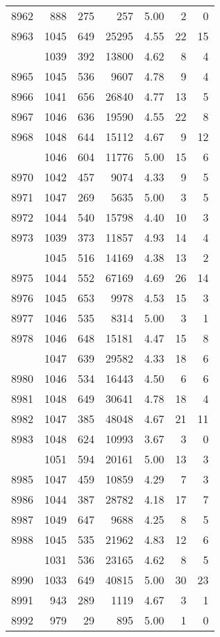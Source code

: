 \documentclass[
]{article}
\begin{document}
\begin{table}
\begin{tabular}[t]{lrrrrrr}
8962 & 888 & 275 & 257 & 5.00 & 2 & 0\\
8963 & 1045 & 649 & 25295 & 4.55 & 22 & 15\\
\addlinespace
8964 & 1039 & 392 & 13800 & 4.62 & 8 & 4\\
8965 & 1045 & 536 & 9607 & 4.78 & 9 & 4\\
8966 & 1041 & 656 & 26840 & 4.77 & 13 & 5\\
8967 & 1046 & 636 & 19590 & 4.55 & 22 & 8\\
8968 & 1048 & 644 & 15112 & 4.67 & 9 & 12\\
\addlinespace
8969 & 1046 & 604 & 11776 & 5.00 & 15 & 6\\
8970 & 1042 & 457 & 9074 & 4.33 & 9 & 5\\
8971 & 1047 & 269 & 5635 & 5.00 & 3 & 5\\
8972 & 1044 & 540 & 15798 & 4.40 & 10 & 3\\
8973 & 1039 & 373 & 11857 & 4.93 & 14 & 4\\
\addlinespace
8974 & 1045 & 516 & 14169 & 4.38 & 13 & 2\\
8975 & 1044 & 552 & 67169 & 4.69 & 26 & 14\\
8976 & 1045 & 653 & 9978 & 4.53 & 15 & 3\\
8977 & 1046 & 535 & 8314 & 5.00 & 3 & 1\\
8978 & 1046 & 648 & 15181 & 4.47 & 15 & 8\\
\addlinespace
8979 & 1047 & 639 & 29582 & 4.33 & 18 & 6\\
8980 & 1046 & 534 & 16443 & 4.50 & 6 & 6\\
8981 & 1048 & 649 & 30641 & 4.78 & 18 & 4\\
8982 & 1047 & 385 & 48048 & 4.67 & 21 & 11\\
8983 & 1048 & 624 & 10993 & 3.67 & 3 & 0\\
\addlinespace
8984 & 1051 & 594 & 20161 & 5.00 & 13 & 3\\
8985 & 1047 & 459 & 10859 & 4.29 & 7 & 3\\
8986 & 1044 & 387 & 28782 & 4.18 & 17 & 7\\
8987 & 1049 & 647 & 9688 & 4.25 & 8 & 5\\
8988 & 1045 & 535 & 21962 & 4.83 & 12 & 6\\
\addlinespace
8989 & 1031 & 536 & 23165 & 4.62 & 8 & 5\\
8990 & 1033 & 649 & 40815 & 5.00 & 30 & 23\\
8991 & 943 & 289 & 1119 & 4.67 & 3 & 1\\
8992 & 979 & 29 & 895 & 5.00 & 1 & 0\\

\end{tabular}
\end{table}
\end{document}

